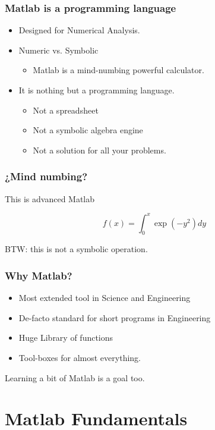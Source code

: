 \documentclass[12pt]{beamer}
\begin{document}
\begin{frame}
  \frametitle{Matlab is a programming language}
  \begin{itemize}
  \item Designed for Numerical Analysis.
  \item Numeric vs. Symbolic
    \begin{itemize}
    \item Matlab is a mind-numbing powerful calculator.
    \end{itemize}
  \item It is nothing but a programming language.
    \begin{itemize}
    \item Not a spreadsheet
    \item Not a symbolic algebra engine
    \item Not a solution for all your problems.
    \end{itemize}
  \end{itemize}
\end{frame}

\begin{frame}
  \frametitle{¿Mind numbing?}
This is advanced Matlab

\[ f(x) = \int_0^x \exp(-y^2) dy \]

\testcode

BTW: this is not a symbolic operation.
\end{frame}

\begin{frame}
  \frametitle{Why Matlab?}

  \begin{itemize}
  \item Most extended tool in Science and Engineering
  \item De-facto standard for short programs in Engineering
  \item Huge Library of functions
  \item Tool-boxes for almost everything.
  \end{itemize}

  Learning a bit of Matlab is a goal too.
\end{frame}

\section{Matlab Fundamentals}
\end{document}
